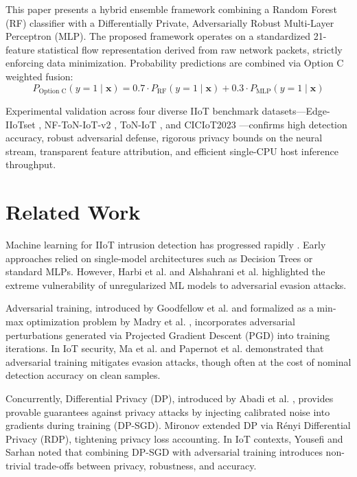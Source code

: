 \documentclass[10pt,journal,compsoc,twocolumn]{IEEEtran}
\begin{document}
This paper presents a hybrid ensemble framework combining a Random Forest (RF) classifier \cite{breiman2001random} with a Differentially Private, Adversarially Robust Multi-Layer Perceptron (MLP). The proposed framework operates on a standardized 21-feature statistical flow representation derived from raw network packets, strictly enforcing data minimization. Probability predictions are combined via Option C weighted fusion:
\begin{equation}
P_{\text{Option C}}(y=1 \mid \mathbf{x}) = 0.7 \cdot P_{\text{RF}}(y=1 \mid \mathbf{x}) + 0.3 \cdot P_{\text{MLP}}(y=1 \mid \mathbf{x})
\label{eq:option_c}
\end{equation}

Experimental validation across four diverse IIoT benchmark datasets—Edge-IIoTset \cite{edge2024benchmarking}, NF-ToN-IoT-v2 \cite{sarhan2021netflow}, ToN-IoT \cite{moustafa2020toniot}, and CICIoT2023 \cite{ciciot2023dataset}—confirms high detection accuracy, robust adversarial defense, rigorous privacy bounds on the neural stream, transparent feature attribution, and efficient single-CPU host inference throughput.

\section{Related Work}
Machine learning for IIoT intrusion detection has progressed rapidly \cite{khazane2024holistic, ijfmr2024review}. Early approaches relied on single-model architectures such as Decision Trees or standard MLPs. However, Harbi et al. \cite{harbi2024roadmap} and Alshahrani et al. \cite{alshahrani2021adversarial} highlighted the extreme vulnerability of unregularized ML models to adversarial evasion attacks.

Adversarial training, introduced by Goodfellow et al. \cite{goodfellow2015explaining} and formalized as a min-max optimization problem by Madry et al. \cite{madry2018towards}, incorporates adversarial perturbations generated via Projected Gradient Descent (PGD) into training iterations. In IoT security, Ma et al. \cite{ma2025backdoor} and Papernot et al. \cite{papernot2016crafting} demonstrated that adversarial training mitigates evasion attacks, though often at the cost of nominal detection accuracy on clean samples.

Concurrently, Differential Privacy (DP), introduced by Abadi et al. \cite{abadi2016deep}, provides provable guarantees against privacy attacks by injecting calibrated noise into gradients during training (DP-SGD). Mironov \cite{mironov2017renyi} extended DP via R{\'e}nyi Differential Privacy (RDP), tightening privacy loss accounting. In IoT contexts, Yousefi and Sarhan \cite{yousefi2023differentially} noted that combining DP-SGD with adversarial training introduces non-trivial trade-offs between privacy, robustness, and accuracy.
\end{document}
